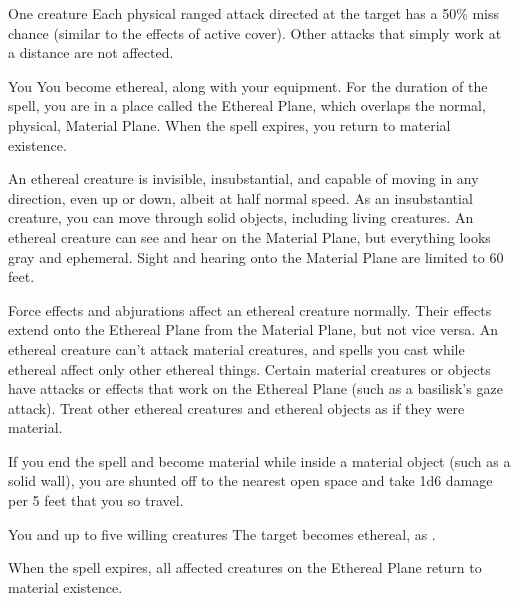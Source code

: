 \spelldur{\durshort \dismissable}
\begin{spelltarget}{One creature}
    \spelleffect Each physical ranged attack directed at the target has a 50\% miss chance (similar to the effects of active cover). Other attacks that simply work at a distance are not affected.
\end{spelltarget}

\spelldur{\durshort \dismissable}
\begin{spelltarget}{You}
\spelleffect You become ethereal, along with your equipment. For the duration of the spell, you are in a place called the Ethereal Plane, which overlaps the normal, physical, Material Plane. When the spell expires, you return to material existence.
\par An ethereal creature is invisible, insubstantial, and capable of moving in any direction, even up or down, albeit at half normal speed. As an insubstantial creature, you can move through solid objects, including living creatures. An ethereal creature can see and hear on the Material Plane, but everything looks gray and ephemeral. Sight and hearing onto the Material Plane are limited to 60 feet.
\par Force effects and abjurations affect an ethereal creature normally. Their effects extend onto the Ethereal Plane from the Material Plane, but not vice versa. An ethereal creature can't attack material creatures, and spells you cast while ethereal affect only other ethereal things. Certain material creatures or objects have attacks or effects that work on the Ethereal Plane (such as a basilisk's gaze attack). Treat other ethereal creatures and ethereal objects as if they were material. 
\par If you end the spell and become material while inside a material object (such as a solid wall), you are shunted off to the nearest open space and take 1d6 damage per 5 feet that you so travel.
\end{spelltarget}

\begin{spelltarget}{You and up to five willing creatures}
    \spelleffect The target becomes ethereal, as .
\end{spelltarget}
\spellnotes When the spell expires, all affected creatures on the Ethereal Plane return to material existence.

